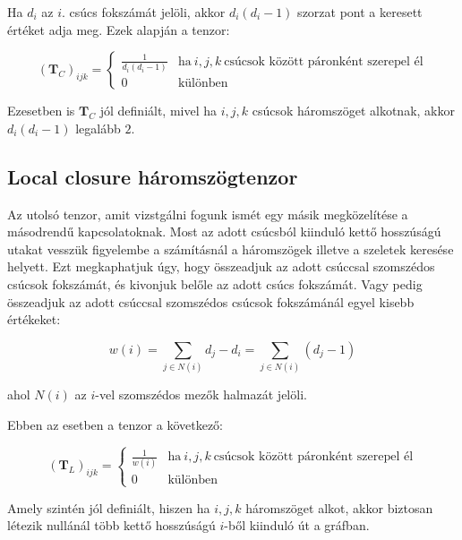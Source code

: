 \documentclass[12pt,numbers=noenddot]{report}
\begin{document}
Ha $d_i$ az $i.$ csúcs fokszámát jelöli, akkor $d_i(d_i-1)$ szorzat pont a 
keresett értéket adja meg. Ezek alapján a tenzor:

\begin{equation}
	(\boldsymbol{T}_C)_{ijk} = 
		\begin{cases}
			\frac{1}{d_i(d_i-1)} & \text{ha} ~ i, j, k ~ \text{csúcsok között páronként szerepel él} \\
			0 & \text{különben}
		\end{cases}
\end{equation}

Ezesetben is $\boldsymbol{T}_C$ jól definiált, mivel ha 
$i, j, k$ csúcsok háromszöget alkotnak, akkor $d_i(d_i-1)$ legalább $2$.

\pagebreak

\subsection*{Local closure háromszögtenzor}

Az utolsó tenzor, amit vizstgálni fogunk ismét egy másik megközelítése a 
másodrendű kapcsolatoknak.
Most az adott csúcsból kiinduló kettő hosszúságú utakat vesszük figyelembe a
számításnál a háromszögek illetve a szeletek keresése helyett.
Ezt megkaphatjuk úgy, hogy összeadjuk az adott csúccsal szomszédos csúcsok 
fokszámát, és kivonjuk belőle az adott csúcs fokszámát.
Vagy pedig összeadjuk az adott csúccsal szomszédos csúcsok fokszámánál egyel
kisebb értékeket:

$$w(i) = \sum_{j \in N(i)} d_j - d_i = \sum_{j \in N(i)} (d_j - 1)$$

ahol $N(i)$ az $i$-vel szomszédos mezők halmazát jelöli.

Ebben az esetben a tenzor a következő:

\begin{equation}
	(\boldsymbol{T}_L)_{ijk} = 
		\begin{cases}
			\frac{1}{w(i)} & \text{ha} ~ i, j, k ~ \text{csúcsok között páronként szerepel él} \\
			0 & \text{különben}
		\end{cases}
\end{equation}

Amely szintén jól definiált, hiszen ha $i, j, k$ háromszöget alkot, akkor 
biztosan létezik nullánál több kettő hosszúságú $i$-ből kiinduló út a gráfban.

\end{document}
